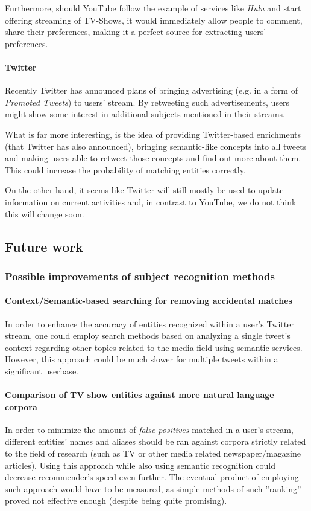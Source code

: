 Furthermore, should YouTube follow the example of services like \textit{Hulu} and start offering streaming of TV-Shows,
it would immediately allow people to comment, share their preferences, making it a perfect source for extracting users' preferences.

\paragraph{Twitter}
Recently Twitter has announced plans of bringing advertising (e.g. in a form of \textit{Promoted Tweets}) to users' stream.
By retweeting such advertisements, users might show some interest in additional subjects mentioned in their streams.

What is far more interesting, is the idea of providing Twitter-based enrichments (that Twitter has also announced), bringing
semantic-like concepts into all tweets and making users able to retweet those concepts and find out more about them. This
could increase the probability of matching entities correctly.

On the other hand, it seems like Twitter will still mostly be used to update information on current activities and, in
contrast to YouTube, we do not think this will change soon.

\subsection{Future work}

\subsubsection{Possible improvements of subject recognition methods}

\paragraph{Context/Semantic-based searching for removing accidental matches}
In order to enhance the accuracy of entities recognized within a user's Twitter stream, one could employ search methods
based on analyzing a single tweet's context regarding other topics related to the media field using semantic services.
However, this approach could be much slower for multiple tweets within a significant userbase.

\paragraph{Comparison of TV show entities against more natural language corpora}
In order to minimize the amount of \textit{false positives} matched in a user's stream, different entities' names and aliases
should be ran against corpora strictly related to the field of research (such as TV or other media related newspaper/magazine
articles). Using this approach while also using semantic recognition could decrease recommender's speed even further. The
eventual product of employing such approach would have to be measured, as simple methods of such ''ranking'' proved not effective enough (despite being quite promising).

